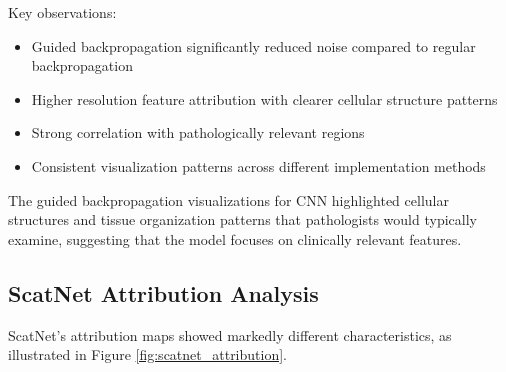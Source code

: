 \documentclass[10pt,twocolumn]{article}
\begin{document}
Key observations:
\begin{itemize}
    \item Guided backpropagation significantly reduced noise compared to regular backpropagation
    \item Higher resolution feature attribution with clearer cellular structure patterns
    \item Strong correlation with pathologically relevant regions
    \item Consistent visualization patterns across different implementation methods
\end{itemize}

The guided backpropagation visualizations for CNN highlighted cellular structures and tissue organization patterns that pathologists would typically examine, suggesting that the model focuses on clinically relevant features.

\subsection{ScatNet Attribution Analysis}
ScatNet's attribution maps showed markedly different characteristics, as illustrated in Figure \ref{fig:scatnet_attribution}.
\end{document}
